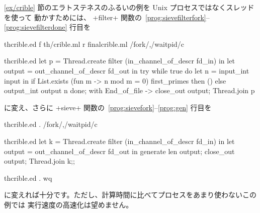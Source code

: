 \begin{example}
\label{ex/crible-copro}
\ref{ex/crible} 節のエラトステネスのふるいの例を Unix プロセスではなくスレッドを使って
動かすためには、 \ml+filter+ 関数の~{\ref{prog:sievefilterfork}--\ref{prog:sievefilterdone}} 行目を
%
\begin{codefile}{thcrible.ed}
f th/crible.ml
r finalcrible.ml
/fork/,/waitpid/c
\end{codefile}
%
\begin{listingcodefile}{thcrible.ed}
    let p = Thread.create filter (in_channel_of_descr fd_in) in
    let output = out_channel_of_descr fd_out in
    try
      while true do
        let n = input_int input in
        if List.exists (fun m -> n mod m = 0) first_primes then ()
        else output_int output n
      done;
    with End_of_file ->
      close_out output;
      Thread.join p
\end{listingcodefile}
%
に変え、さらに \ml+sieve+ 関数の~{\ref{prog:sievefork}--\ref{prog:gen}} 行目を
%
\begin{codefile}{thcrible.ed}
.
/fork/,/waitpid/c
\end{codefile}
%
\begin{listingcodefile}{thcrible.ed}
  let k = Thread.create filter (in_channel_of_descr fd_in) in
  let output = out_channel_of_descr fd_out in
  generate len output;
  close_out output;
  Thread.join k;;
\end{listingcodefile}
%
\begin{codefile}{thcrible.ed}
.
wq
\end{codefile}
%
に変えれば十分です。ただし、計算時間に比べてプロセスをあまり使わないこの例では
実行速度の高速化は望めません。
\end{example}


